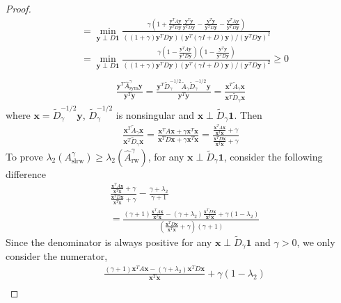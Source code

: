 \documentclass{article}
\newcommand{\0}{{\boldsymbol{0}}}
\newcommand{\6}{{\partial}}
\newcommand{\8}{{\infty}}
\newcommand{\4}{{\nabla}}
\begin{document}
\begin{proof}
\begin{align*}
& = \min_{\bm{y} \perp D \bm{1}} \frac{ \gamma \left( 1 + \frac{\bm{y}^T A \bm{y}}{\bm{y}^T D \bm{y}} \frac{\bm{y}^T \bm{y}}{\bm{y}^T D \bm{y}} - \frac{\bm{y}^T \bm{y}}{\bm{y}^T D \bm{y}} - \frac{\bm{y}^T A \bm{y}}{\bm{y}^T D \bm{y}}   \right) }{((1+\gamma) \bm{y}^T D \bm{y}) (\bm{y}^T (\gamma I + D) \bm{y}) / (\bm{y}^T D \bm{y})^2} \\
& = \min_{\bm{y} \perp D \bm{1}} 
\frac{\gamma \left( 1 - \frac{\bm{y}^T A \bm{y}}{\bm{y}^T D \bm{y}}\right ) \left(1- \frac{\bm{y}^T \bm{y}}{\bm{y}^T D \bm{y}}\right)}
{((1+\gamma) \bm{y}^T D \bm{y}) (\bm{y}^T (\gamma I + D) \bm{y}) / (\bm{y}^T D \bm{y})^2}
\geq 0\\
\end{align*}
\iffalse
\begin{align*}
 \frac{\bm{y}^T \hat{A}_{\text{sym}}^\gamma \bm{y}}{\bm{y}^T \bm{y}} = \frac{\bm{y}^T \tilde{D}_\gamma^{-1/2} \tilde{A}_\gamma \tilde{D}_\gamma^{-1/2} \bm{y}}{\bm{y}^T \bm{y}} = \frac{\bm{x}^T  \tilde{A}_\gamma  \bm{x}}{\bm{x}^T \tilde{D}_\gamma \bm{x}} 
\end{align*}
where $\bm{x} = \tilde{D}_\gamma^{-1/2} \bm{y}$, $\tilde{D}_\gamma^{-1/2}$ is nonsingular and $\bm{x} \perp  \tilde{D}_\gamma \bm{1}$. Then
\begin{align*}
 \frac{\bm{x}^T  \tilde{A}_\gamma  \bm{x}}{\bm{x}^T \tilde{D}_\gamma \bm{x}} = \frac{\bm{x}^T A \bm{x} + \gamma \bm{x}^T \bm{x}}{\bm{x}^T D \bm{x} + \gamma \bm{x}^T \bm{x}} = \frac{ \frac{\bm{x}^T A \bm{x}}{\bm{x}^T \bm{x}} + \gamma}{\frac{\bm{x}^T D \bm{x}}{\bm{x}^T \bm{x}} + \gamma} 
\end{align*}
To prove $\lambda_2(A_{\text{slrw}}^\gamma) \geq \lambda_2(\hat{A}_{\text{rw}}^\gamma)$, for any  $\bm{x} \perp  \tilde{D}_\gamma \bm{1}$, consider the following difference
\begin{align*}
& \frac{ \frac{\bm{x}^T A \bm{x}}{\bm{x}^T \bm{x}} + \gamma}{\frac{\bm{x}^T D \bm{x}}{\bm{x}^T \bm{x}} + \gamma} -  \frac{\gamma+\lambda_2}{\gamma + 1} \\
& = \frac{(\gamma + 1)\frac{\bm{x}^T A \bm{x}}{\bm{x}^T \bm{x}} - (\gamma+\lambda_2)\frac{\bm{x}^T D \bm{x}}{\bm{x}^T \bm{x}} + \gamma(1- \lambda_2)}{(\frac{\bm{x}^T D \bm{x}}{\bm{x}^T \bm{x}} + \gamma)(\gamma + 1)}
\end{align*}
Since the denominator is always positive for any $\bm{x} \perp  \tilde{D}_\gamma \bm{1}$ and $\gamma >0$, we only consider the numerator,
\begin{align*}
    & \frac{(\gamma + 1)\bm{x}^T A \bm{x} - (\gamma+\lambda_2) \bm{x}^T D \bm{x}}{\bm{x}^T \bm{x}} + \gamma(1- \lambda_2)\\

\end{align*}
\end{proof}
\end{document}
